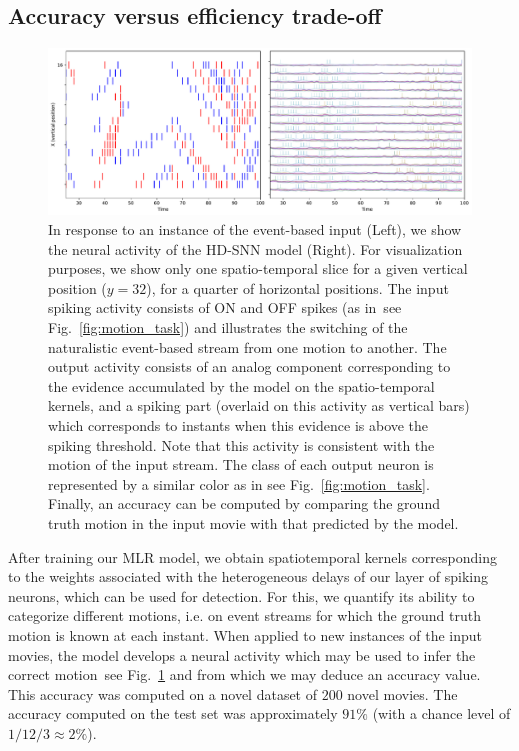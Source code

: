\documentclass[default]{sn-jnl}%
\theoremstyle{thmstyleone}%
\theoremstyle{thmstyletwo}%
\theoremstyle{thmstylethree}%
\newcommand{\seeFig}[1]{see Fig.~\ref{fig:#1}}%
\begin{document}
\subsection{Accuracy versus efficiency trade-off}%
%
\begin{figure}%
    \centering
    \includegraphics[width=0.95\linewidth]{figures/conv_HD-SNN.pdf}
    \caption{
        In response to an instance of the event-based input (Left), we show the neural activity of the HD-SNN model (Right). For visualization purposes, we show only one spatio-temporal slice for a given vertical position ($y = 32$), for a quarter of horizontal positions. The input spiking activity consists of ON and OFF spikes (as in~\seeFig{motion_task}) and illustrates the switching of the naturalistic event-based stream from one motion to another. The output activity consists of an analog component corresponding to the evidence accumulated by the model on the spatio-temporal kernels, and a spiking part (overlaid on this activity as vertical bars) which corresponds to instants when this evidence is above the spiking threshold. Note that this activity is consistent with the motion of the input stream. The class of each output neuron is represented by a similar color as in \seeFig{motion_task}. Finally, an accuracy can be computed by comparing the ground truth motion in the input movie with that predicted by the model.
        }
    \label{fig:activity}
\end{figure}
%
After training our MLR model, we obtain spatiotemporal kernels corresponding to the weights associated with the heterogeneous delays of our layer of spiking neurons, which can be used for detection. For this, we quantify its ability to categorize different motions, i.e. on event streams for which the ground truth motion is known at each instant. When applied to new instances of the input movies, the model develops a neural activity which may be used to infer the correct motion~\seeFig{activity} and from which we may deduce an accuracy value. This accuracy was computed on a novel dataset of $200$ novel movies. The accuracy computed on the test set was approximately $91\%$ (with a chance level of $1 / 12/ 3 \approx 2\%$). %
\end{document}
